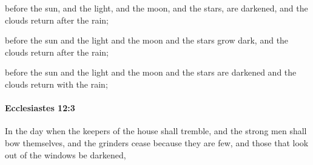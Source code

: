 			\begin{versebox}
					\item[BHS] 
					\item[LXX] 
					\item[ASV] before the sun, and the light, and the moon, and the stars, are darkened, and the clouds return after the rain;
					\item[NIV] before the sun and the light and the moon and the stars grow dark, and the clouds return after the rain;
					\item[NRSV] before the sun and the light and the moon and the stars are darkened and the clouds return with the rain;
			\end{versebox}

		\paragraph{Ecclesiastes 12:3} %
			\label{ECCLESIASTES-12-3}

			In the day when the keepers of the house shall tremble, and the strong men shall bow themselves, and the grinders cease because they are few, and those that look out of the windows be darkened,

